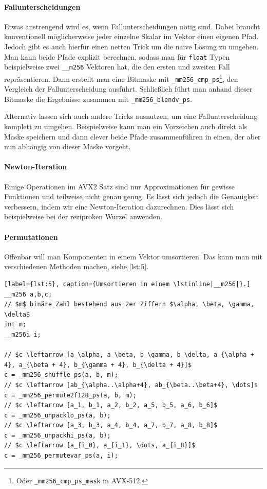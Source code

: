 \paragraph{Fallunterscheidungen}
Etwas anstrengend wird es, wenn Fallunterscheidungen nötig sind.
Dabei braucht konventionell möglicherweise jeder einzelne Skalar im Vektor einen eigenen Pfad.
Jedoch gibt es auch hierfür einen netten Trick um die naive Lösung zu umgehen.
Man kann beide Pfade explizit berechnen, sodass man für \lstinline|float| Typen beispielweise zwei \lstinline|__m256| Vektoren hat, die den ersten und zweiten Fall repräsentieren.
Dann erstellt man eine Bitmaske mit \lstinline|_mm256_cmp_ps|\footnote{Oder \lstinline|_mm256_cmp_ps_mask| in AVX-512.}, den Vergleich der Fallunterscheidung ausführt.
Schließlich führt man anhand dieser Bitmaske die Ergebnisse zusammen mit \lstinline|_mm256_blendv_ps|.

Alternativ lassen sich auch andere Tricks ausnutzen, um eine Fallunterscheidung komplett zu umgehen.
Beispielweise kann man ein Vorzeichen auch direkt als Maske speichern und dann clever beide Pfade zusammenführen in einen, der aber nun abhängig von dieser Maske vorgeht.

\paragraph{Newton-Iteration}
Einige Operationen im AVX2 Satz sind nur Approximationen für gewisse Funktionen und teilweise nicht genau genug.
Es lässt sich jedoch die Genauigkeit verbessern, indem wir eine Newton-Iteration dazurechnen.
Dies lässt sich beispielweise bei der reziproken Wurzel anwenden.

\paragraph{Permutationen}
Offenbar will man Komponenten in einem Vektor umsortieren.
Das kann man mit verschiedenen Methoden machen, siehe \autoref{lst:5}.

\begin{lstlisting}[label={lst:5}, caption={Umsortieren in einem \lstinline|__m256|}.]
__m256 a,b,c;
// $m$ binäre Zahl bestehend aus 2er Ziffern $\alpha, \beta, \gamma, \delta$
int m;
__m256i i;

// $c \leftarrow [a_\alpha, a_\beta, b_\gamma, b_\delta, a_{\alpha + 4}, a_{\beta + 4}, b_{\gamma + 4}, b_{\delta + 4}]$
c = _mm256_shuffle_ps(a, b, m);
// $c \leftarrow [ab_{\alpha..\alpha+4}, ab_{\beta..\beta+4}, \dots]$
c = _mm256_permute2f128_ps(a, b, m);
// $c \leftarrow [a_1, b_1, a_2, b_2, a_5, b_5, a_6, b_6]$
c = _mm256_unpacklo_ps(a, b);
// $c \leftarrow [a_3, b_3, a_4, b_4, a_7, b_7, a_8, b_8]$
c = _mm256_unpackhi_ps(a, b);
// $c \leftarrow [a_{i_0}, a_{i_1}, \dots, a_{i_8}]$
c = _mm256_permutevar_ps(a, i);
\end{lstlisting}

